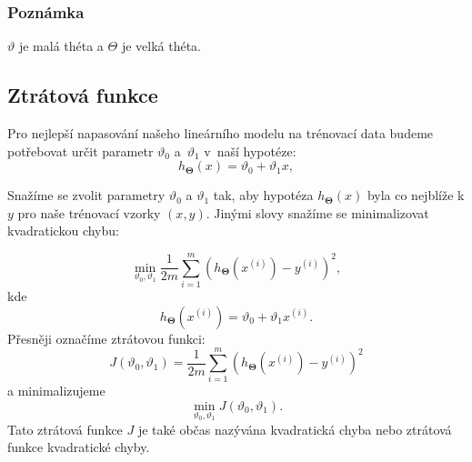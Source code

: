\subsubsection*{Poznámka}
\par{$\vartheta$ je malá théta a $\Theta$ je velká théta.}

\newpage















\subsection{Ztrátová funkce}
\label{sec:LinearniRegreseZtratovaFunkce}

\par{Pro nejlepší napasování našeho lineárního modelu na trénovací data budeme potřebovat určit parametr $\vartheta_0$ a~$\vartheta_1$ v~naší hypotéze:
\begin{equation}
	h_{\bm{\Theta}} \left( x \right) = \vartheta_0 + \vartheta_1 x,
\end{equation}}

\par{Snažíme se zvolit parametry $\vartheta_0$ a $\vartheta_1$ tak, aby hypotéza $h_{\bm{\Theta}} \left( x \right)$ byla co nejblíže k $y$ pro naše trénovací vzorky $\left( x, y \right)$. Jinými slovy snažíme se minimalizovat kvadratickou chybu:

\begin{equation}
	\min_{\vartheta_0, \vartheta_1} \frac{1}{2m} \sum_{i = 1}^{m} \left( h_{\bm{\Theta}} \left( x^{\left( i \right)} \right) - y^{\left( i \right)} \right)^2,
\end{equation}
kde
\begin{equation}
	h_{\bm{\Theta}} \left( x^{\left( i \right)} \right) = \vartheta_0 + \vartheta_1 x^{\left( i \right)}.
	\label{eq:hProJednoDato}
\end{equation}
Přesněji označíme ztrátovou funkci:
\begin{equation}
	J \left( \vartheta_0, \vartheta_1 \right) = \frac{1}{2m} \sum_{i = 1}^{m} \left( h_{\bm{\Theta}} \left( x^{\left( i \right)} \right) - y^{\left( i \right)} \right)^2
\end{equation}
a minimalizujeme
\begin{equation}
	\min_{\vartheta_0, \vartheta_1} 	J \left( \vartheta_0, \vartheta_1 \right).
\end{equation}
Tato ztrátová funkce $J$ je také občas nazývána kvadratická chyba nebo ztrátová funkce kvadratické chyby.}


